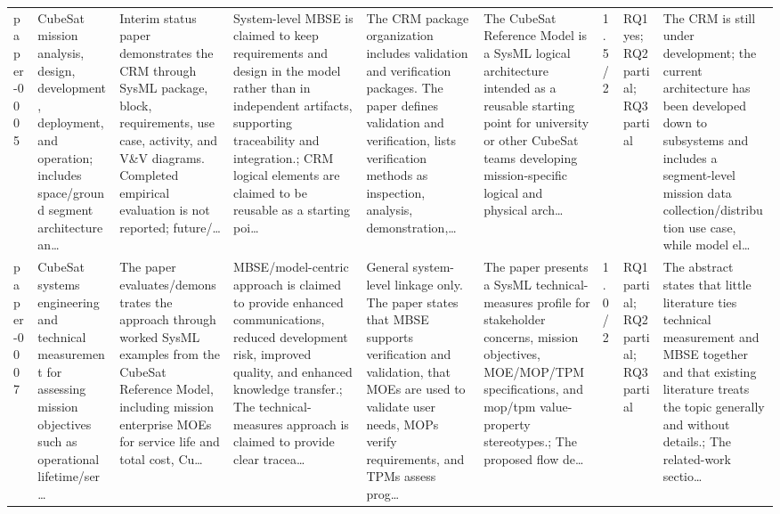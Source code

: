 \documentclass[10pt]{article}
\begin{document}
\begin{landscape}
\begin{longtable}{p{1.0cm}p{2.4cm}p{3.1cm}p{3.7cm}p{3.4cm}p{3.1cm}p{1.0cm}p{1.8cm}p{3.4cm}}
paper-0005 & CubeSat mission analysis, design, development, deployment, and operation; includes space/ground segment architecture an… & Interim status paper demonstrates the CRM through SysML package, block, requirements, use case, activity, and V\&V diagrams. Completed empirical evaluation is not reported; future/… & System-level MBSE is claimed to keep requirements and design in the model rather than in independent artifacts, supporting traceability and integration.; CRM logical elements are claimed to be reusable as a starting poi… & The CRM package organization includes validation and verification packages. The paper defines validation and verification, lists verification methods as inspection, analysis, demonstration,… & The CubeSat Reference Model is a SysML logical architecture intended as a reusable starting point for university or other CubeSat teams developing mission-specific logical and physical arch… & 1.5/2 & RQ1 yes; RQ2 partial; RQ3 partial & The CRM is still under development; the current architecture has been developed down to subsystems and includes a segment-level mission data collection/distribution use case, while model el… \\
paper-0007 & CubeSat systems engineering and technical measurement for assessing mission objectives such as operational lifetime/ser… & The paper evaluates/demonstrates the approach through worked SysML examples from the CubeSat Reference Model, including mission enterprise MOEs for service life and total cost, Cu… & MBSE/model-centric approach is claimed to provide enhanced communications, reduced development risk, improved quality, and enhanced knowledge transfer.; The technical-measures approach is claimed to provide clear tracea… & General system-level linkage only. The paper states that MBSE supports verification and validation, that MOEs are used to validate user needs, MOPs verify requirements, and TPMs assess prog… & The paper presents a SysML technical-measures profile for stakeholder concerns, mission objectives, MOE/MOP/TPM specifications, and mop/tpm value-property stereotypes.; The proposed flow de… & 1.0/2 & RQ1 partial; RQ2 partial; RQ3 partial & The abstract states that little literature ties technical measurement and MBSE together and that existing literature treats the topic generally and without details.; The related-work sectio… \\

\end{longtable}
\end{landscape}
\end{document}
